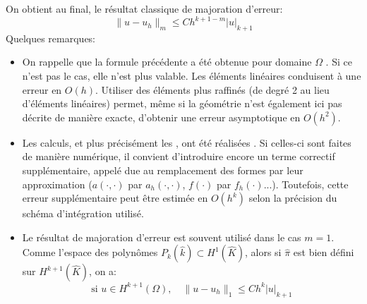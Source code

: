 On obtient au final, le résultat classique de majoration d'erreur:
\begin{equation}
\|u-u_h\|_m\le C h^{k+1-m} |u|_{k+1}
\end{equation}
Quelques remarques:
\begin{itemize}
  \item On rappelle que la formule précédente a été obtenue pour domaine $\Omega$
	. Si ce n'est pas le cas, elle n'est plus valable.
	Les éléments linéaires conduisent à une erreur en $O(h)$.
	Utiliser des éléments plus raffinés (de degré 2 au lieu d'éléments linéaires) permet,
	même si la géométrie n'est également ici pas décrite de manière exacte, d'obtenir une
	erreur asymptotique en $O(h^2)$.
  \item Les calculs, et plus précisément les , ont été réalisées
	.
	Si celles-ci sont faites de manière numérique, il convient d'introduire encore un
	terme correctif supplémentaire, appelé  due au remplacement des
	formes par leur approximation ($a(\cdot,\cdot)$ par $a_h(\cdot,\cdot)$, $f(\cdot)$ par $f_h(\cdot)$...). Toutefois, cette
	erreur supplémentaire peut être estimée en $O(h^k)$ selon la précision du schéma
	d'intégration utilisé.
  \item Le résultat de majoration d'erreur est souvent utilisé dans le cas $m=1$.
	Comme l'espace des polynômes $P_k(\hat{k})\subset H^1(\hat{K})$, alors si
	$\hat{\pi}$ est bien défini sur $H^{k+1}(\hat{K})$, on a:
	\begin{equation}
	\text{si } u\in H^{k+1}(\Omega), \quad \|u-u_h\|_1\le C h^k |u|_{k+1}
	\end{equation}
\end{itemize} 